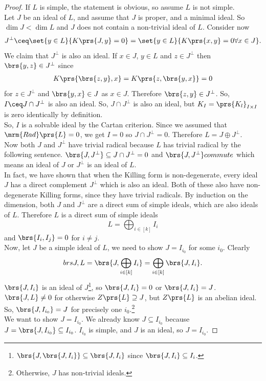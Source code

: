 \documentclass[10pt,a4paper,twoside,openany,hidelinks]{book}
\begin{document}
\begin{proof}
If $L$ is simple, the statement is obvious, so assume $L$ is not simple.\\
Let $J$ be an ideal of $L$, and assume that $J$ is proper, and a minimal ideal. So $\dim J < \dim L$ and $J$ does not contain a non-trivial ideal of $L$.
Consider now \[J^{\perp} \ceq \set{y \in L}{K\prs{J,y} = 0} = \set{y \in L}{K\prs{x,y} = 0 \forall x \in J} \text{.}\]
We claim that $J^{\perp}$ is also an ideal.
If $x \in J$, $y\in L$ and $z \in J^{\perp}$ then $\brs{y,z} \in J^{\perp}$ since
\begin{align*}
K\prs{\brs{z,y},x} = K\prs{z, \brs{y,x}} = 0
\end{align*}
for $z \in J^{\perp}$ and $\brs{y,x} \in J$ as $x \in J$. Therefore $\brs{z,y} \in J^{\perp}$. So, $I \ceq J \cap J^{\perp}$ is also an ideal. So, $J \cap J^{\perp}$ is also an ideal, but $K_I = \prs{K_l}_{I \times I}$ is zero identically by definition.\\
So, $I$ is a solvable ideal by the Cartan criterion. Since we assumed that $\mrm{Rad}\prs{L} = 0$, we get $I = 0$ so $J \cap J^{\perp} = 0$.
Therefore $L = J \oplus J^{\perp}$.\\
Now both $J$ and $J^{\perp}$ have trivial radical because $L$ has trivial radical by the following sentence. $\brs{J,J^{\perp}} \subseteq J \cap J^{\perp} = 0$ and $\brs{J,J^{\perp}} commute$ which means an ideal of $J$ or $J^{\perp}$ is an ideal of $L$.\\
In fact, we have shown that when the Killing form is non-degenerate, every ideal $J$ has a direct complement $J^{\perp}$ which is also an ideal.
Both of these also have non-degenerate Killing forms, since they have trivial radicals.
By induction on the dimension, both $J$ and $J^{\perp}$ are a direct sum of simple ideals, which are also ideals of $L$. Therefore $L$ is a direct sum of simple ideals
\[L = \bigoplus_{i \in [k]} I_i\]
and $\brs{I_i, I_j} = 0$ for $i \neq j$.
\\
Now, let $J$ be a simple ideal of $L$, we need to show $J = I_{i_0}$ for some $i_0$. Clearly
\begin{align*}
brs{J,L} = \brs{J, \bigoplus_{i \in [k]} I_i} = \bigoplus_{i\in[k]} \brs{J, I_i} \text{.}
\end{align*}
$\brs{J,I_i}$ is an ideal of $J$\footnote{$\brs{J,\brs{J,I_i}} \subseteq \brs{J,I_i}$ since $\brs{J,I_i} \subseteq I_i$.}, so $\brs{J,I_i} = 0$ or $\brs{J,I_i} = J$.\\
$\brs{J,L} \neq 0$ for otherwise $Z\prs{L} \supseteq J$, but $Z\prs{L}$ is an abelian ideal. So, $\brs{J,I_{i_0}} = J$ for precisely one $i_0$.\footnote{Otherwise, $J$ has non-trivial ideals.}\\
We want to show $J = I_{i_0}$. We already know $J \subseteq I_{i_0}$ because $J = \brs{J, I_{i_0}} \subseteq I_{i_0}$. $I_{i_0}$ is simple, and $J$ is an ideal, so $J = I_{i_0}$.
\end{proof}
\end{document}
